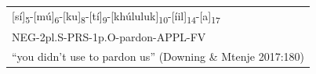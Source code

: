 \begin{tabular}{@{}l@{}}
\Large \textcolor{planarhighlight}{[sí]\textsubscript{5}}-\textcolor{planarhighlight}{[mú]\textsubscript{6}}-\textcolor{planarhighlight}{[ku]\textsubscript{8}}-\textcolor{planarhighlight}{[tí]\textsubscript{9}}-\textcolor{planarhighlight}{[khúluluk]\textsubscript{10}}-\textcolor{planarhighlight}{[íil]\textsubscript{14}}-\textcolor{planarhighlight}{[a]\textsubscript{17}} \\[4pt]
\large NEG-2pl.S-PRS-1p.O-pardon-APPL-FV \\[12pt]
\parbox[t]{262.13817pt}{\raggedright\Large ``you didn't use to pardon us'' (Downing \& Mtenje 2017:180)} \\
\end{tabular}

